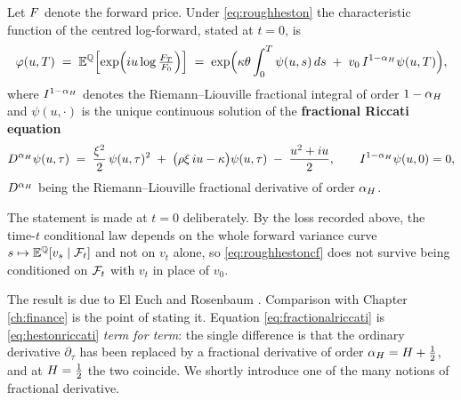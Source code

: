 \begin{theorem}\label{thm:roughhestoncf}
Let $F$ denote the forward price. Under \eqref{eq:roughheston} the
characteristic function of the centred log-forward, stated at $t=0$, is
\begin{equation}\label{eq:roughhestoncf}
\varphi(u,T) \;=\; \mathbb{E}^{\mathbb{Q}}\Bigl[ \exp\Bigl(iu \log\tfrac{F_T}{F_0}\Bigr) \Bigr]
\;=\; \exp\Bigl( \kappa\theta \int_0^{T}\psi(u,s)\,d s \;+\; v_0\, I^{1-\alpha_H}\psi(u,T) \Bigr),
\end{equation}
where $I^{1-\alpha_H}$ denotes the Riemann--Liouville fractional integral of order
$1-\alpha_H$ and $\psi(u,\cdot)$ is the unique continuous solution of the \textbf{fractional
Riccati equation}
\begin{equation}\label{eq:fractionalriccati}
D^{\alpha_H}\psi(u,\tau) \;=\; \frac{\xi^2}{2}\,\psi(u,\tau)^2 \;+\; \bigl(\rho\xi\, i u - \kappa\bigr)\psi(u,\tau) \;-\; \frac{u^2+iu}{2},
\qquad I^{1-\alpha_H}\psi(u,0) = 0,
\end{equation}
$D^{\alpha_H}$ being the Riemann--Liouville fractional derivative of order $\alpha_H$.
\qedopentext
\end{theorem}

The statement is made at $t=0$ deliberately. By the loss recorded above, the time-$t$ conditional
law depends on the whole forward variance curve $s\mapsto\mathbb{E}^{\mathbb{Q}}[v_s\mid\mathcal{F}_t]$ and not on $v_t$
alone, so \eqref{eq:roughhestoncf} does not survive being conditioned on $\mathcal{F}_t$ with $v_t$ in place
of $v_0$.

The result is due to El Euch and Rosenbaum \cite{eleucrosenbaum2019}. Comparison with Chapter
\ref{ch:finance} is the point of stating it. Equation \eqref{eq:fractionalriccati} is
\eqref{eq:hestonriccati} \emph{term for term}: the single
difference is that the ordinary derivative $\partial_\tau$ has been replaced by a fractional
derivative of order $\alpha_H = H+\tfrac12$, and at $H = \tfrac12$ the two coincide. We shortly introduce one of the many notions of fractional derivative. 



